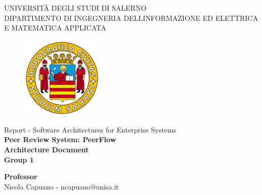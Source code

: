 \begin{titlepage}
    \begin{center}
        \LARGE{\uppercase{Università degli Studi di Salerno}}\\
        \vspace{5mm}
    	\uppercase{\normalsize Dipartimento di Ingegneria dell\textquotesingle Informazione ed Elettrica e Matematica applicata}\\
    \end{center}
    
    \vspace{2mm}
    \begin{figure}[H]
        \centering
        \includegraphics[width=0.35\textwidth]{logo_unisa}
    \end{figure}
    \vspace{2mm}
    
    \begin{center}
    	\normalsize{Report - Software Architectures for Enterprise Systems}\\
    	\vspace{10mm}
        {\huge{\bf Peer Review System: PeerFlow}}\\
        \vspace{2mm}
        {\LARGE{\bf Architecture Document}}\\
        \vspace{2mm}
        {\normalsize{\bf Group 1}}
    \end{center}
    
    \vspace{10mm}
    \noindent
    \begin{center}
            \textbf{Professor}\\
            \vspace{2mm}
            Nicola Capuano - ncapuano@unisa.it
    \end{center}
    
    \vspace{12mm} %
    

\end{titlepage}

